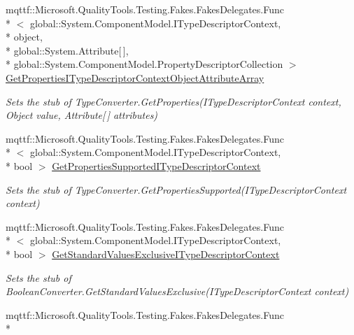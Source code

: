 \begin{DoxyCompactItemize}
mqttf\-::\-Microsoft.\-Quality\-Tools.\-Testing.\-Fakes.\-Fakes\-Delegates.\-Func\\*
$<$ global\-::\-System.\-Component\-Model.\-I\-Type\-Descriptor\-Context, \\*
object, \\*
global\-::\-System.\-Attribute\mbox{[}$\,$\mbox{]}, \\*
global\-::\-System.\-Component\-Model.\-Property\-Descriptor\-Collection $>$ \hyperlink{class_system_1_1_component_model_1_1_fakes_1_1_stub_boolean_converter_a7e7ca18bced48f10c719c4c96994b34d}{Get\-Properties\-I\-Type\-Descriptor\-Context\-Object\-Attribute\-Array}
\begin{DoxyCompactList}\small\item\em Sets the stub of Type\-Converter.\-Get\-Properties(\-I\-Type\-Descriptor\-Context context, Object value, Attribute\mbox{[}$\,$\mbox{]} attributes)\end{DoxyCompactList}\item 
mqttf\-::\-Microsoft.\-Quality\-Tools.\-Testing.\-Fakes.\-Fakes\-Delegates.\-Func\\*
$<$ global\-::\-System.\-Component\-Model.\-I\-Type\-Descriptor\-Context, \\*
bool $>$ \hyperlink{class_system_1_1_component_model_1_1_fakes_1_1_stub_boolean_converter_a4e8cbeedb23fc101b59a3b1a1358a33f}{Get\-Properties\-Supported\-I\-Type\-Descriptor\-Context}
\begin{DoxyCompactList}\small\item\em Sets the stub of Type\-Converter.\-Get\-Properties\-Supported(\-I\-Type\-Descriptor\-Context context)\end{DoxyCompactList}\item 
mqttf\-::\-Microsoft.\-Quality\-Tools.\-Testing.\-Fakes.\-Fakes\-Delegates.\-Func\\*
$<$ global\-::\-System.\-Component\-Model.\-I\-Type\-Descriptor\-Context, \\*
bool $>$ \hyperlink{class_system_1_1_component_model_1_1_fakes_1_1_stub_boolean_converter_a86efb9280b2856265fc30b3306e4020e}{Get\-Standard\-Values\-Exclusive\-I\-Type\-Descriptor\-Context}
\begin{DoxyCompactList}\small\item\em Sets the stub of Boolean\-Converter.\-Get\-Standard\-Values\-Exclusive(\-I\-Type\-Descriptor\-Context context)\end{DoxyCompactList}\item 
mqttf\-::\-Microsoft.\-Quality\-Tools.\-Testing.\-Fakes.\-Fakes\-Delegates.\-Func\\*

\end{DoxyCompactItemize}
